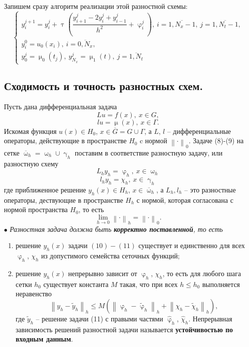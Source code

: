 \documentclass[a4paper, 12pt]{report}
\numberwithin{equation}{section}
\newcommand{\ol}{\overline}
\renewcommand{\leq}{\leqslant}
\renewcommand{\gamma}{\upgamma}
\renewcommand{\varphi}{\upvarphi}
\renewcommand{\tau}{\uptau}
\renewcommand{\mu}{\upmu}
\renewcommand{\omega}{\upomega}
\newcommand\Norm[1]{\left\| #1 \right\|}
\begin{document}
		Запишем сразу алгоритм реализации этой разностной схемы:
		\begin{equation}
			\begin{cases}
			y_i^{j+1} = y_i^j + \tau \left(\dfrac{y_{i+1}^j - 2y_i^j + y_{i-1}^j}{h^2} + \varphi_i^j\right),\ i=\ol{1, N_x-1},\ j=\ol{1, N_t-1},\\
		y_i^0 = u_0(x_i),\ i=\ol{0,N_x},\\
		y_0^j = \mu_0(t_j),\ y_{N_x}^j = \mu_1(t),\ j=\ol{1, N_t}
		\end{cases}
		\end{equation}
		\subsection{Сходимость и точность разностных схем.}
		Пусть дана дифференциальная задача 
		\begin{equation}
			Lu = f(x),\ x \in G,
		\end{equation}
		\begin{equation}
			lu = \mu(x),\ x \in \Gamma.
		\end{equation}
		Искомая функция $u(x) \in H_0$, $x \in \ol G = G \cup \Gamma$, а $L$, $l$ -- дифференциальные операторы, действующие в пространстве $H_0$ c нормой $\Norm{\cdot}_0$.
		Задаче (8)-(9) на сетке $\ol\omega_h = \omega_h \cup \gamma_h$ поставим в соответствие разностную задачу, или разностную схему
		\begin{equation}
			L_h y_h = \varphi_h,\ x \in \omega_h
		\end{equation}
		\begin{equation}
			l_h y_h = \chi _h,\ x \in \gamma_h
		\end{equation}
		где приближенное решение $y_h(x) \in H_h$, $x \in \ol\omega_h$, а $L_h, l_h$ -- это разностные операторы, дествующие в пространстве $H_h$ с нормой, которая согласована с нормой пространства $H_0$, то есть
		$$\lim\limits_{h \to 0}\Norm{\cdot}_h = \Norm{\cdot}_0.$$
		$\bullet$ \textit{Разностная задача должна быть \textbf{корректно поставленной}, то есть}
			\begin{enumerate}
				\item решение $y_h(x)$ задачи $(10)-(11)$ существует и единственно для всех $\varphi_h$, $\chi_h$ из допустимого семейства сеточных функций;
				\item решение $y_h(x)$ непрерывно зависит от $\varphi_h$, $\chi_h$, то есть для любого шага сетки $h_0$ существует константа $M$ такая, что при всех $h \leq h_0$ выполняется неравенство $$\Norm{y_h-\widetilde{y}_h}_h \leq M\left(\Norm{\varphi_h - \widetilde{\varphi}_h}_h + \Norm{\chi_h - \widetilde{\chi}_h}_h\right),$$
				где $\widetilde{y}_h$ -- решение задачи (11) с правыми частями $\widehat{\varphi}_h$, $\widehat{\chi}_h$. Непрерывная зависимость решений разностной задачи называется \textbf{устойчивостью по входным данным}.
			\end{enumerate} 
\end{document}
